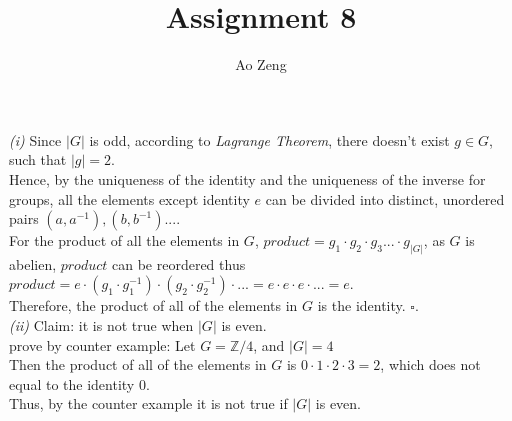 \documentclass[11pt]{article}
\newcommand{\abs}[1]{\lvert #1 \rvert}
\newenvironment{problem}[2][Problem]{\begin{trivlist}
\item[\hskip \labelsep {\bfseries #1}\hskip \labelsep {\bfseries #2.}]}{\end{trivlist}}
\begin{document}
\title{Assignment 8}
\author{Ao Zeng}
\maketitle

\begin{problem}{1}
\textit{(i)} Since $\abs{G}$ is odd, according to \textit{Lagrange Theorem}, there doesn't exist $g \in G$, such that $\abs{g} = 2$.\\
Hence, by the uniqueness of the identity and the uniqueness of the inverse for groups, all the elements except identity $e$ can be divided into distinct, unordered pairs $(a, a^{-1}), (b, b^{-1}) ...$.\\
For the product of all the elements in $G$, $product = g_1 \cdot g_2 \cdot g_3 ... \cdot g_{\abs{G}}$, as $G$ is abelien, $product$ can be reordered thus $product = e \cdot(g_1 \cdot g_1^{-1}) \cdot (g_2 \cdot g_2^{-1}) \cdot ... = e \cdot e \cdot e \cdot ... = e$.\\
Therefore, the product of all of the elements in $G$ is the identity. $\square$.\\
\textit{(ii)} Claim: it is not true when $\abs{G}$ is even.\\
prove by counter example: Let $G = \mathbb{Z}/4$, and $\abs{G} = 4$\\
Then the product of all of the elements in $G$ is $ 0 \cdot 1 \cdot 2 \cdot 3  = 2$, which does not equal to the identity $0$.\\
Thus, by the counter example it is not true if $\abs{G}$ is even.
\end{problem}
\end{document}
